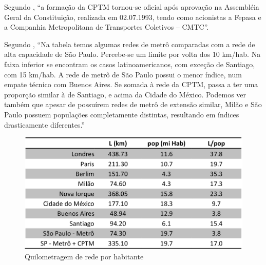 	Segundo , ``a formação da CPTM tornou-se oficial após aprovação na Assembléia Geral da	Constituição, realizada em 02.07.1993, tendo como acionistas a Fepasa e a Companhia Metropolitana de Transportes Coletivos – CMTC''.
	
	Segundo , ``Na tabela temos algumas redes de metrô comparadas com a rede de alta  capacidade  de  São  Paulo.  Percebe-se  um  limite  por  volta  dos  10 km/hab.  Na  faixa  inferior  se  encontram  os  casos  latinoamericanos, com  exceção  de  Santiago,  com  15  km/hab.  A  rede  de  metrô  de  São Paulo possui o menor índice, num empate técnico com Buenos Aires. Se  somada  à  rede  da  CPTM,  passa  a  ter  uma  proporção  similar  à  de Santiago,  e  acima  da  Cidade  do  México.  Podemos  ver  também  que 
	apesar de possuírem redes de metrô de extensão similar, Milão e São Paulo  possuem  populações  completamente  distintas,  resultando  em índices drasticamente diferentes.''
	
	\begin{figure}[h]
		\caption{Quilometragem de rede por habitante 
		}
		\includegraphics[keepaspectratio,width=\textwidth]{img_isoda_km_rede.png}
	\end{figure}
	
